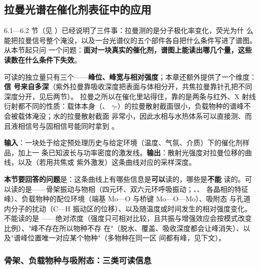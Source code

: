 
\subsection{拉曼光谱在催化剂表征中的应用}

6.1—6.2 节（见 ）已经说明了三件事：拉曼测的是分子极化率变化，荧光为什
么能把拉曼信号整个淹没，以及一台光谱仪的五个部件各自把什么条件写进了谱图。从本节起只问
一个问题：\textbf{面对一块真实的催化剂，谱图上能读出哪几个量，这些读数在什么条件下失效}。

可读的独立量只有三个——\textbf{峰位、峰宽与相对强度}；本章还额外提供了一个维度：\textbf{信
号来自多深}（紫外拉曼靠吸收深度把表面与体相分开，共焦拉曼靠针孔把不同深度分开，见后两节）。
拉曼之所以在催化里站得住，靠的是两条与红外、X 射线衍射都不同的性质：载体本身（、
$\gamma$-）的拉曼散射截面很小，负载物种的谱峰不会被载体淹没；水的拉曼散射截面
非常小，因此水相与水热体系可以直接测、而且液相信号与固相信号能同时拿到
。

\begin{probout}
\textbf{输入}：一块处于给定预处理历史与给定环境（温度、气氛、介质）下的催化剂样品，加上一
条已知波长与功率密度的激发线。\textbf{输出}：散射光强度对拉曼位移的曲线，以及（若用共焦或
紫外激发）这条曲线对应的采样深度。

\textbf{本节要回答的问题}是：这条曲线上有哪些信息是\textbf{可以}读的，哪些是\textbf{不能}
读的。可以读的是——骨架振动与物相（四元环、双六元环呼吸振动；、、
 各晶相的特征峰）、负载物种的配位环境（端基 Mo—O 与桥键 Mo—O—Mo）、吸附态
与孔道内分子的扰动（C—H 振动区的位移）、以及随温度或时间发生的相对强度变化。不能读的是
——绝对浓度（强度只可相对比较，且共振与增强效应会按模式改变比例）、"峰不存在所以物种不存
在"（脱水、覆盖、吸收深度都会让峰消失）、以及"谱峰位置唯一对应某个物种"（多物种在同一区
间都有峰，见下文）。
\end{probout}

\subsubsection{骨架、负载物种与吸附态：三类可读信息}

